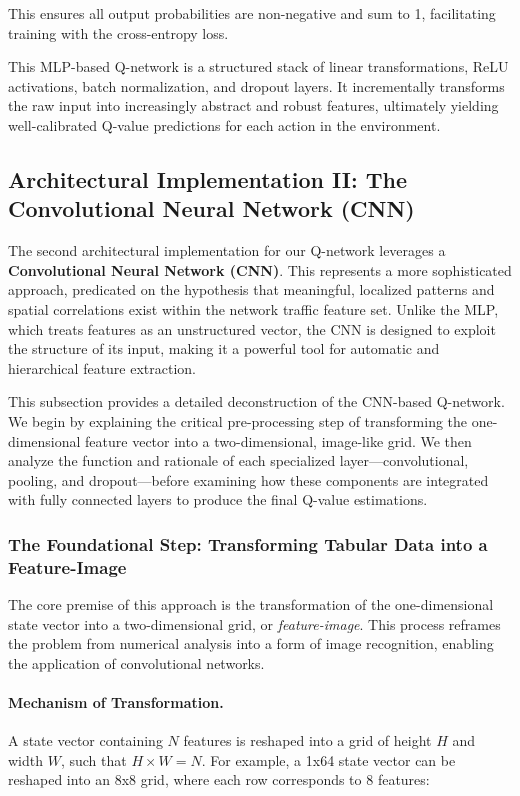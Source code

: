 \documentclass{report}
\begin{document}
This ensures all output probabilities are non-negative and sum to 1, facilitating training with the cross-entropy loss.

This MLP-based Q-network is a structured stack of linear transformations, ReLU activations, batch normalization, and dropout layers. It incrementally transforms the raw input into increasingly abstract and robust features, ultimately yielding well-calibrated Q-value predictions for each action in the environment.

\subsection{Architectural Implementation II: The Convolutional Neural Network (CNN)}

The second architectural implementation for our Q-network leverages a \textbf{Convolutional Neural Network (CNN)}. This represents a more sophisticated approach, predicated on the hypothesis that meaningful, localized patterns and spatial correlations exist within the network traffic feature set. Unlike the MLP, which treats features as an unstructured vector, the CNN is designed to exploit the structure of its input, making it a powerful tool for automatic and hierarchical feature extraction.

This subsection provides a detailed deconstruction of the CNN-based Q-network. We begin by explaining the critical pre-processing step of transforming the one-dimensional feature vector into a two-dimensional, image-like grid. We then analyze the function and rationale of each specialized layer---convolutional, pooling, and dropout---before examining how these components are integrated with fully connected layers to produce the final Q-value estimations.

\subsubsection{The Foundational Step: Transforming Tabular Data into a Feature-Image}

The core premise of this approach is the transformation of the one-dimensional state vector into a two-dimensional grid, or \textit{feature-image}. This process reframes the problem from numerical analysis into a form of image recognition, enabling the application of convolutional networks.

\paragraph{Mechanism of Transformation.} A state vector containing $N$ features is reshaped into a grid of height $H$ and width $W$, such that $H \times W = N$. For example, a 1x64 state vector can be reshaped into an 8x8 grid, where each row corresponds to 8 features:
\end{document}
